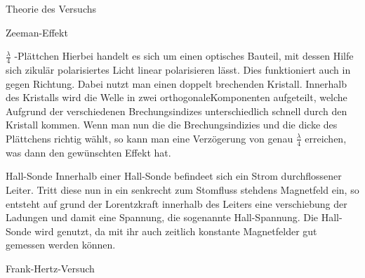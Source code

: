 \documentclass[pdftex, a4paper,11pt, twoside, ngerman]{report}
\begin{document}
\begin{chapter}{Theorie des Versuchs}
\begin{section}{Zeeman-Effekt}
      \begin{subsection}{$\frac \lambda 4$ -Plättchen}
        Hierbei handelt es sich um einen optisches Bauteil, mit dessen Hilfe
        sich zikulär polarisiertes Licht linear polarisieren lässt. Dies
        funktioniert auch in gegen Richtung. Dabei nutzt man einen doppelt
        brechenden Kristall. Innerhalb des Kristalls wird die Welle in zwei
        orthogonaleKomponenten aufgeteilt, welche Aufgrund der verschiedenen
        Brechungsindizes unterschiedlich schnell durch den Kristall kommen.
        Wenn man nun die die Brechungsindizies und die dicke des Plättchens
        richtig wählt, so kann man eine Verzögerung von genau $\frac \lambda 4$
        erreichen, was dann den gewünschten Effekt hat.
        
      \end{subsection}
      
      
      
      \begin{subsection}{Hall-Sonde}
        Innerhalb einer Hall-Sonde befindeet sich ein Strom durchflossener
        Leiter. Tritt diese nun in ein senkrecht zum Stomfluss stehdens
        Magnetfeld ein, so entsteht auf grund der Lorentzkraft innerhalb des
        Leiters eine verschiebung der Ladungen und damit eine Spannung, die
        sogenannte Hall-Spannung. Die Hall-Sonde wird genutzt, da mit ihr auch
        zeitlich konstante Magnetfelder gut gemessen werden können.
        

      \end{subsection}
      
    \end{section}
    
    
    
    \begin{section}{Frank-Hertz-Versuch}
      

\end{section}
\end{chapter}
\end{document}
